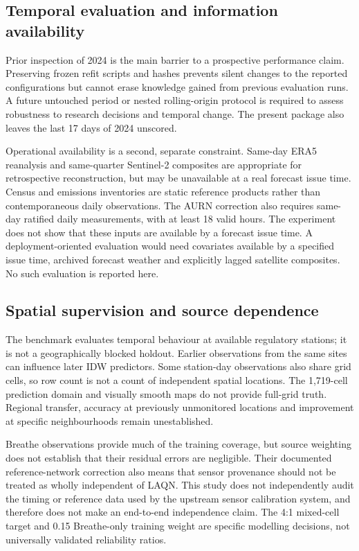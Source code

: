 \documentclass[11pt,a4paper]{article}
\begin{document}
\subsection{Temporal evaluation and information availability}
Prior inspection of 2024 is the main barrier to a prospective performance
claim. Preserving frozen refit scripts and hashes prevents silent changes to
the reported configurations but cannot erase knowledge gained from previous
evaluation runs. A future untouched period or nested rolling-origin protocol
is required to assess robustness to research decisions and temporal change.
The present package also leaves the last 17 days of 2024 unscored.

Operational availability is a second, separate constraint. Same-day ERA5
reanalysis and same-quarter Sentinel-2 composites are appropriate for
retrospective reconstruction, but may be unavailable at a real forecast issue
time. Census and emissions inventories are static reference products rather
than contemporaneous daily observations. The AURN correction also requires
same-day ratified daily measurements, with at least 18 valid hours. The
experiment does not show that these inputs are available by a forecast issue
time. A deployment-oriented evaluation
would need covariates available by a specified issue time, archived forecast
weather and explicitly lagged satellite composites. No such evaluation is
reported here.

\subsection{Spatial supervision and source dependence}
The benchmark evaluates temporal behaviour at available regulatory stations;
it is not a geographically blocked holdout. Earlier observations from the
same sites can influence later IDW predictors. Some station-day observations
also share grid cells, so row count is not a count of independent spatial
locations. The 1,719-cell prediction domain and visually smooth maps do not
provide full-grid truth. Regional transfer, accuracy at previously unmonitored
locations and improvement at specific neighbourhoods remain unestablished.

Breathe observations provide much of the training coverage, but source
weighting does not establish that their residual errors are negligible. Their
documented reference-network correction also means that sensor provenance
should not be treated as wholly independent of LAQN. This study does not
independently audit the timing or reference data used by the upstream sensor
calibration system, and therefore does not make an end-to-end independence
claim. The 4:1 mixed-cell target and 0.15 Breathe-only training weight are
specific modelling decisions, not universally validated reliability ratios.
\end{document}
